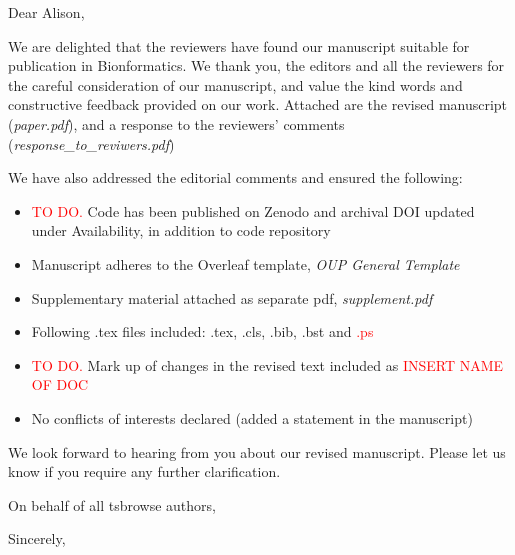 \documentclass{letter}
\begin{document}
\begin{letter}{}

\opening{Dear Alison,}

We are delighted that the reviewers have found our manuscript suitable for publication 
in Bionformatics. We thank you, the editors and all the reviewers for the careful 
consideration of our manuscript, and value the kind words and constructive feedback 
provided on our work. Attached are the revised manuscript (\textit{paper.pdf}), 
and a response to the reviewers' comments (\textit{response\_to\_reviwers.pdf})

We have also addressed the editorial comments and ensured the following:
\begin{itemize}
    \item \textcolor{red}{TO DO.} Code has been published on Zenodo and archival DOI updated 
    under Availability, in addition to code repository
    \item Manuscript adheres to the Overleaf template, \textit{OUP General Template}
    \item Supplementary material attached as separate pdf, \textit{supplement.pdf}
    \item Following .tex files included: .tex, .cls, .bib, .bst and \textcolor{red}{.ps}
    \item \textcolor{red}{TO DO.} Mark up of changes in the revised text included as 
        \textcolor{red}{INSERT NAME OF DOC}
    \item No conflicts of interests declared (added a statement in the manuscript)
\end{itemize}

We look forward to hearing from you about our revised manuscript. Please let us know if you require any 
further clarification.

On behalf of all tsbrowse authors,
\closing{Sincerely,}

\end{letter}
\end{document}
